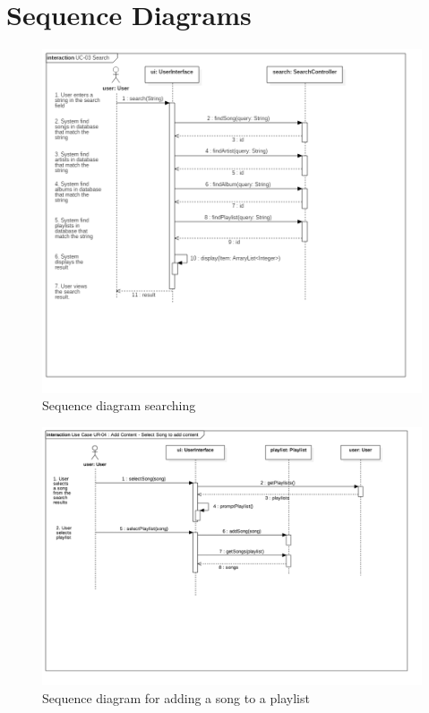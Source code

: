 \documentclass[12pt]{article}
\begin{document}
	\section{Sequence Diagrams}
	\begin{figure}[H]
		\centering
		\includegraphics[scale=0.35]{UR-03Search.png}
		\caption{Sequence diagram searching}
		\label{fig:sequenceSearch}
	\end{figure}
	\begin{figure}[H]
		\centering
		\includegraphics[scale=0.35]{UseCaseAddSong.png}
		\caption{Sequence diagram for adding a song to a playlist}
		\label{fig:sequenceSong}
	\end{figure}
\end{document}
